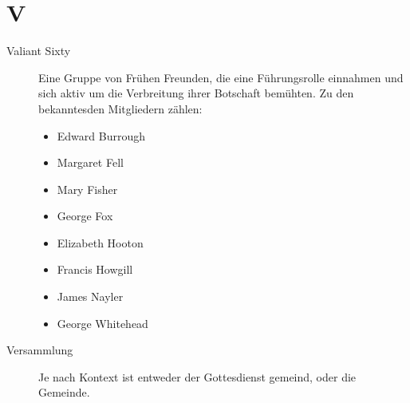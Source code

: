 \section*{V}

\articlesize

\begin{description}

 \item[Valiant Sixty] Eine Gruppe von Frühen Freunden, die eine Führungsrolle einnahmen und sich aktiv um die Verbreitung ihrer Botschaft bemühten. Zu den bekanntesden Mitgliedern zählen:
 \begin{itemize}
  \item Edward Burrough
  \item Margaret Fell
  \item Mary Fisher
  \item George Fox
  \item Elizabeth Hooton
  \item Francis Howgill
  \item James Nayler
  \item George Whitehead
 \end{itemize}

 \item[Versammlung] Je nach Kontext ist entweder der Gottesdienst gemeind, oder die Gemeinde.
 \end{description}

\normalsize
